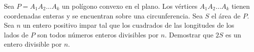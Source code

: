 Sea $P = A_1A_2 \dots A_k$ un polígono convexo en el plano. Los vértices $A_1A_2 \dots A_k$ tienen coordenadas enteras y se encuentran sobre una circunferencia. Sea $S$ el área de $P$. Sea $n$ un entero positivo impar tal que los cuadrados de las longitudes de los lados de $P$ son todos números enteros divisibles por $n$. Demostrar que $2S$ es un entero divisible por $n$.